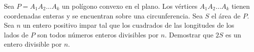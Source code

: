 Sea $P = A_1A_2 \dots A_k$ un polígono convexo en el plano. Los vértices $A_1A_2 \dots A_k$ tienen coordenadas enteras y se encuentran sobre una circunferencia. Sea $S$ el área de $P$. Sea $n$ un entero positivo impar tal que los cuadrados de las longitudes de los lados de $P$ son todos números enteros divisibles por $n$. Demostrar que $2S$ es un entero divisible por $n$.